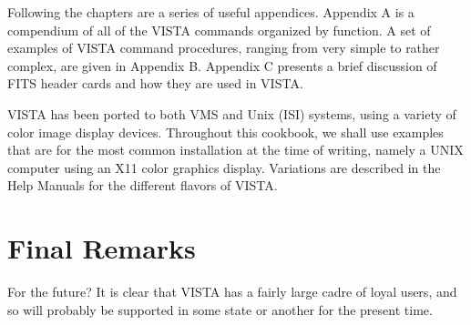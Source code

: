 Following the chapters are a series of useful appendices. Appendix A is a
compendium of all of the VISTA commands organized by function.  A set of
examples of VISTA command procedures, ranging from very simple to rather
complex, are given in Appendix B. Appendix C presents a brief discussion of
FITS header cards and how they are used in VISTA. 

VISTA has been ported to both VMS and Unix (ISI) systems, using a variety of
color image display devices.  Throughout this cookbook, we shall use examples
that are for the most common installation at the time of writing, namely a
UNIX computer using an X11 color graphics display.  
Variations are described in the Help Manuals for the different
flavors of VISTA. 

\section{Final Remarks}

For the future? It is clear that VISTA has a fairly large cadre of
loyal users, and so will probably be supported in some state or another for
the present time.

%
%
%
%
%
%
% 
%
%
%
%
%
